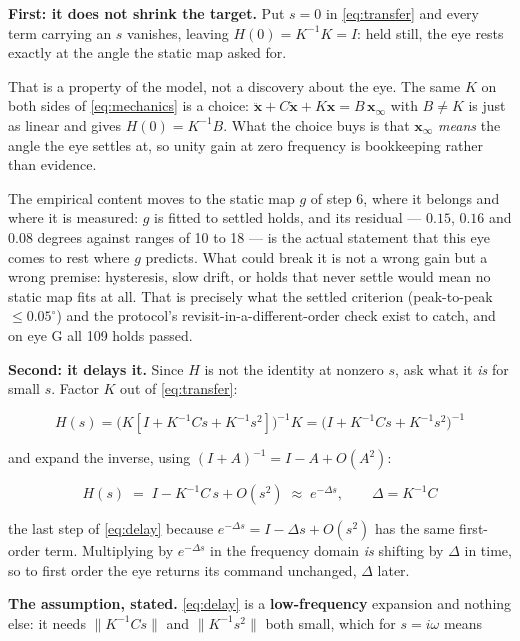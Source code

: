 \documentclass[10pt]{article}
\begin{document}
\textbf{First: it does not shrink the target.} Put $s=0$ in \eqref{eq:transfer} and every
term carrying an $s$ vanishes, leaving $H(0)=K^{-1}K=I$: held still, the eye rests exactly
at the angle the static map asked for.

That is a property of the model, not a discovery about the eye. The same $K$ on both sides
of \eqref{eq:mechanics} is a choice:
$\ddot{\mathbf{x}}+C\dot{\mathbf{x}}+K\mathbf{x}=B\,\mathbf{x}_\infty$ with $B\neq K$ is
just as linear and gives $H(0)=K^{-1}B$. What the choice buys is that $\mathbf{x}_\infty$
\emph{means} the angle the eye settles at, so unity gain at zero frequency is bookkeeping
rather than evidence.

The empirical content moves to the static map $g$ of step 6, where it belongs and where it
is measured: $g$ is fitted to settled holds, and its residual --- $0.15$, $0.16$ and $0.08$
degrees against ranges of 10 to 18 --- is the actual statement that this eye comes to rest
where $g$ predicts. What could break it is not a wrong gain but a wrong premise: hysteresis,
slow drift, or holds that never settle would mean no static map fits at all. That is
precisely what the settled criterion (peak-to-peak $\le 0.05^{\circ}$) and the protocol's
revisit-in-a-different-order check exist to catch, and on eye G all 109 holds passed.

\textbf{Second: it delays it.} Since $H$ is not the identity at nonzero $s$, ask what it
\emph{is} for small $s$. Factor $K$ out of \eqref{eq:transfer}:

\begin{equation}
\label{eq:transfer-factored}
H(s)=\big(K\left[I + K^{-1}Cs + K^{-1}s^{2}\right]\big)^{-1}K
=\big(I + K^{-1}Cs + K^{-1}s^{2}\big)^{-1}
\end{equation}

and expand the inverse, using $(I+A)^{-1}=I-A+O(A^{2})$:

\begin{equation}
\label{eq:delay}
H(s)\;=\;I-K^{-1}C\,s+O(s^{2})
\;\approx\;e^{-\Delta s},
\qquad
\Delta = K^{-1}C
\end{equation}

the last step of \eqref{eq:delay} because $e^{-\Delta s}=I-\Delta s+O(s^{2})$ has the same
first-order term. Multiplying by $e^{-\Delta s}$ in the frequency domain \emph{is} shifting
by $\Delta$ in time, so to first order the eye returns its command unchanged, $\Delta$
later.

\textbf{The assumption, stated.} \eqref{eq:delay} is a \textbf{low-frequency} expansion and
nothing else: it needs $\lVert K^{-1}Cs\rVert$ and $\lVert K^{-1}s^{2}\rVert$ both small,
which for $s=i\omega$ means
\end{document}
